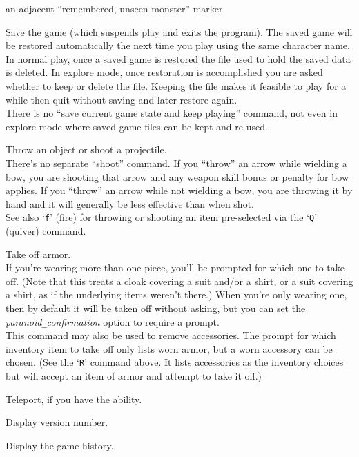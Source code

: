 an adjacent ``remembered, unseen monster'' marker.
\item[\tb{S}]
Save the game (which suspends play and exits the program).
The saved game will be restored automatically the next time you play
using the same character name.\\
In normal play, once a saved game is restored the file used to hold
the saved data is deleted.
In explore mode, once restoration is accomplished you are asked whether
to keep or delete the file.
Keeping the file makes it feasible to play for a while then quit
without saving and later restore again.\\
There is no ``save current game state and keep playing'' command, not
even in explore mode where saved game files can be kept and re-used.
\item[\tb{t}]
Throw an object or shoot a projectile.\\
There's no separate ``shoot'' command.
If you ``throw'' an arrow while wielding a bow, you are shooting
that arrow and any weapon skill bonus or penalty for bow applies.
If you ``throw'' an arrow while not wielding a bow, you are throwing
it by hand and it will generally be less effective than when shot.\\
See also `{\tt f}' (fire) for throwing or shooting an item pre-selected
via the `{\tt Q}' (quiver) command.
\item[\tb{T}]
Take off armor.\\
If you're wearing more than one piece, you'll be prompted for which
one to take off.  (Note that this treats a cloak covering a suit
and/or a shirt, or a suit covering a shirt, as if the underlying items
weren't there.)
When you're only wearing one, then by default it will
be taken off without asking, but you can set the
{\it paranoid\verb+_+confirmation\/}
option to require a prompt.\\
This command may also be used to remove accessories.  The prompt
for which inventory item to take off only lists worn armor, but a worn
accessory can be chosen.
(See the `{\tt R}' command above.  It lists accessories as the inventory
choices but will accept an item of armor and attempt to take it off.)
\item[\tb{\^{}T}]
Teleport, if you have the ability.
\item[\tb{v}]
Display version number.
\item[\tb{V}]
Display the game history.
\item[\tb{w}]
